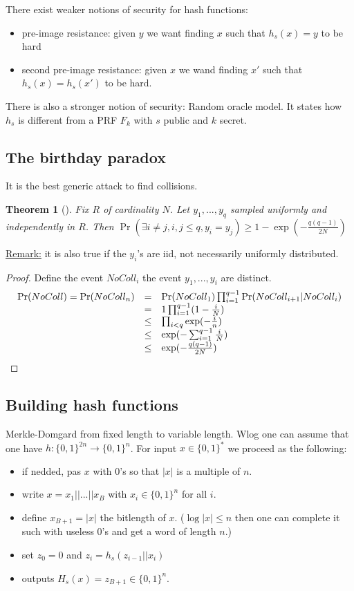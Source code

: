 \documentclass{article}
\newtheorem{thm}{Theorem}[section]
\newcommand{\Thm}[3]{\begin{thm}[#1]\label{#2}#3\end{thm}}
\newcommand{\Rem}{\underline{Remark:} }
\newcommand{\bit}{\{0,1\}}
\begin{document}
There exist weaker notions of security for hash functions:\begin{itemize}
\item pre-image resistance: given $y$ we want finding $x$ such that $h_s(x)=y$ to be hard
\item second pre-image resistance: given $x$ we wand finding $x'$ such that $h_s(x)=h_s(x')$ to be hard.
\end{itemize}

There is also a stronger notion of security: Random oracle model. It states how $h_s$ is different from a PRF $F_k$ with $s$ public and $k$ secret.

\subsection{The birthday paradox}
It is the best generic attack to find collisions.
\Thm{}{}{Fix $R$ of cardinality $N$. Let $y_1,...,y_q$ sampled uniformly and independently in $R$. Then $\Pr(\exists i\neq j, i,j\leq q, y_i=y_j)\geq 1-\exp(-\frac{q(q-1)}{2N})$}

\Rem it is also true if the $y_i$'s are iid, not necessarily uniformly  distributed.

\begin{proof}
Define the event $NoColl_i$ the event $y_1,...,y_i$ are distinct.
\[\begin{array}{r c l}
\Pr(NoColl)=\Pr(NoColl_n) &=& \Pr(NoColl_1)\prod_{i=1}^{q-1}\Pr(NoColl_{i+1}|NoColl_i)\\
&=& 1\prod_{i=1}^{q-1}(1-\frac{i}{N})\\
&\leq& \prod_{i<q}\exp(-\frac{i}{n})\\
&\leq& \exp(-\sum_{i=1}^{q-1}\frac{i}{N})\\
&\leq& \exp(-\frac{q(q-1)}{2N})
\end{array}\]
\end{proof}

\subsection{Building hash functions}
Merkle-Domgard from fixed length to variable length. Wlog one can assume that one have $h:\bit^{2n}\rightarrow\bit^n$. For input $x\in\bit^*$ we proceed as the following:\begin{itemize}
\item if nedded, pas $x$ with $0$'s so that $|x|$ is a multiple of $n$.
\item write $x=x_1||...||x_B$ with $x_i\in\bit^n$ for all $i$.
\item define $x_{B+1}=|x|$ the bitlength of $x$. ($\log|x|\leq n$ then one can complete it such with useless $0$'s and get a word of length $n$.)
\item set $z_0=0$ and $z_i=h_s(z_{i-1}||x_i)$
\item outputs $H_s(x)=z_{B+1}\in\bit^n$.
\end{itemize}
\end{document}
